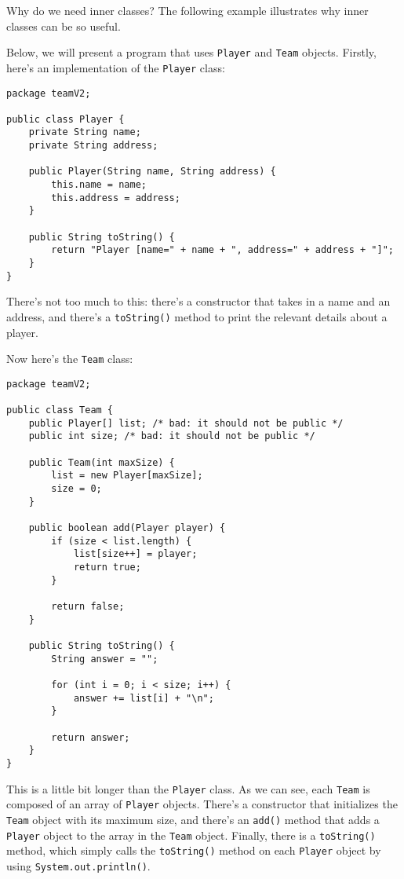Why do we need inner classes? The following example illustrates why inner classes can be so useful. 

Below, we will present a program that uses \verb!Player! and \verb!Team! objects. Firstly, here's an implementation of the \verb!Player! class:

\begin{lstlisting}
package teamV2;

public class Player {
	private String name;
	private String address;

	public Player(String name, String address) {
		this.name = name;
		this.address = address;
	}

	public String toString() {
		return "Player [name=" + name + ", address=" + address + "]";
	}
}
\end{lstlisting}

There's not too much to this: there's a constructor that takes in a name and an address, and there's a \verb!toString()! method to print the relevant details about a player. 

Now here's the \verb!Team! class:

\begin{lstlisting}
package teamV2;

public class Team {
	public Player[] list; /* bad: it should not be public */
	public int size; /* bad: it should not be public */

	public Team(int maxSize) {
		list = new Player[maxSize];
		size = 0;
	}

	public boolean add(Player player) {
		if (size < list.length) {
			list[size++] = player;
			return true;
		}
		
		return false;
	}

	public String toString() {
		String answer = "";

		for (int i = 0; i < size; i++) {
			answer += list[i] + "\n";
		}

		return answer;
	}
}
\end{lstlisting}

This is a little bit longer than the \verb!Player! class. As we can see, each \verb!Team! is composed of an array of \verb!Player! objects. There's a constructor that initializes the \verb!Team! object with its maximum size, and there's an \verb!add()! method that adds a \verb!Player! object to the array in the \verb!Team! object. Finally, there is a \verb!toString()! method, which simply calls the \verb!toString()! method on each \verb!Player! object by using \verb!System.out.println()!. 

